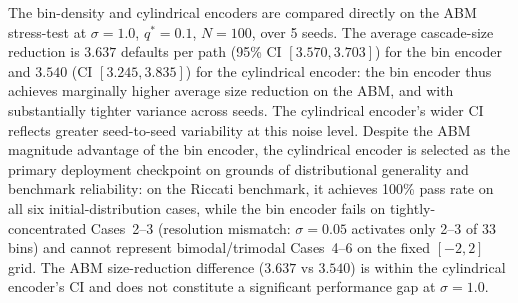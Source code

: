 \documentclass[11pt]{article}
\begin{document}
The bin-density and cylindrical encoders are compared directly on the ABM stress-test at $\sigma = 1.0$, $q^* = 0.1$, $N = 100$, over 5 seeds. The average cascade-size reduction is $3.637$ defaults per path (95\% CI $[3.570, 3.703]$) for the bin encoder and $3.540$ (CI $[3.245, 3.835]$) for the cylindrical encoder: the bin encoder thus achieves marginally higher average size reduction on the ABM, and with substantially tighter variance across seeds. The cylindrical encoder's wider CI reflects greater seed-to-seed variability at this noise level. Despite the ABM magnitude advantage of the bin encoder, the cylindrical encoder is selected as the primary deployment checkpoint on grounds of distributional generality and benchmark reliability: on the Riccati benchmark, it achieves 100\% pass rate on all six initial-distribution cases, while the bin encoder fails on tightly-concentrated Cases~2--3 (resolution mismatch: $\sigma = 0.05$ activates only 2--3 of 33 bins) and cannot represent bimodal/trimodal Cases~4--6 on the fixed $[-2,2]$ grid. The ABM size-reduction difference ($3.637$ vs $3.540$) is within the cylindrical encoder's CI and does not constitute a significant performance gap at $\sigma = 1.0$.
\end{document}
